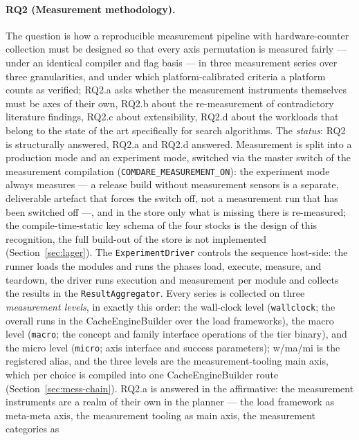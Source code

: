 \begin{nurlang}
\paragraph{RQ2 (Measurement methodology).} The question is how a reproducible measurement pipeline
with hardware-counter collection must be designed so that every axis permutation is measured
fairly --- under an identical compiler and flag basis --- in three measurement series over three
granularities, and under which platform-calibrated criteria a platform counts as verified; RQ2.a
asks whether the measurement instruments themselves must be axes of their own, RQ2.b about the
re-measurement of contradictory literature findings, RQ2.c about extensibility, RQ2.d about the
workloads that belong to the state of the art specifically for search algorithms. The
\emph{status}: RQ2 is structurally answered, RQ2.a and RQ2.d answered. Measurement is split into a
production mode and an experiment mode, switched via the master switch of the measurement
compilation (\texttt{COMDARE\_\allowbreak{}MEASUREMENT\_\allowbreak{}ON}): the experiment mode
always measures --- a release build without measurement sensors is a separate, deliverable
artefact that forces the switch off, not a measurement run that has been switched off ---, and in
the store only what is missing there is re-measured; the compile-time-static key schema of the four
stocks is the design of this recognition, the full build-out of the store is not implemented
(Section~\ref{sec:lager}). The \texttt{ExperimentDriver} controls the sequence host-side: the
runner loads the modules and runs the phases load, execute, measure, and teardown, the driver runs
execution and measurement per module and collects the results in the \texttt{ResultAggregator}.
Every series is collected on three \emph{measurement levels}, in exactly this order: the wall-clock
level (\texttt{wallclock}; the overall runs in the CacheEngineBuilder over the load frameworks),
the macro level (\texttt{macro}; the concept and family interface operations of the tier binary), and
the micro level (\texttt{micro}; axis interface and success parameters); w/ma/mi is the registered
alias, and the three levels are the measurement-tooling main axis, which per choice is compiled
into one CacheEngineBuilder route (Section~\ref{sec:mess-chain}). RQ2.a is answered in the
affirmative: the measurement instruments are a realm of their own in the planner --- the load
framework as meta-meta axis, the measurement tooling as main axis, the measurement categories as

\end{nurlang}
